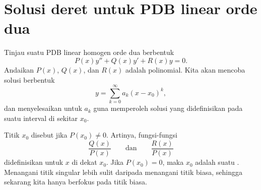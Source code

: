 \sectionnewpage
\section{Solusi deret untuk PDB linear orde dua}
\label{seriessols:section}


Tinjau suatu PDB linear homogen orde dua berbentuk
\begin{equation*}
P(x) y'' + Q(x) y' + R(x) y = 0 .
\end{equation*}
Andaikan $P(x)$, $Q(x)$, dan $R(x)$ adalah polinomial. Kita akan 
mencoba solusi berbentuk
\begin{equation*}
y = \sum_{k=0}^\infty a_k {(x-x_0)}^k ,
\end{equation*}
dan menyelesaikan untuk $a_k$ guna memperoleh solusi yang didefinisikan pada suatu
interval di sekitar $x_0$.

Titik $x_0$ disebut \emph{}
jika $P(x_0) \neq 0$. Artinya, fungsi-fungsi
\begin{equation*}
\frac{Q(x)}{P(x)} \qquad \text{dan} \qquad \frac{R(x)}{P(x)}
\end{equation*}
didefinisikan untuk $x$ di dekat $x_0$. Jika $P(x_0) = 0$, maka $x_0$
adalah suatu \emph{}. Menangani titik singular
lebih sulit daripada menangani titik biasa, sehingga sekarang kita hanya berfokus pada titik biasa.


